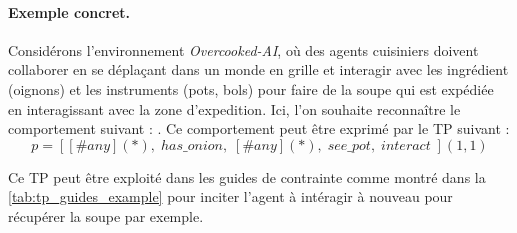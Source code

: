 \documentclass[francais,ROIA,Unicode,manuscript]{cedram}
\begin{document}
\paragraph{Exemple concret.} Considérons l’environnement \textit{Overcooked-AI}, où des agents cuisiniers doivent collaborer en se déplaçant dans un monde en grille et interagir avec les ingrédient (oignons) et les instruments (pots, bols) pour faire de la soupe qui est expédiée en interagissant avec la zone d'expedition. Ici, l’on souhaite reconnaître le comportement suivant : . Ce comportement peut être exprimé par le TP suivant :
\[
    p = [[\#any](*) , \; has\_onion , \; [\#any](*) , \; see\_pot , \; interact \;](1,1)
\]

\noindent
Ce TP peut être exploité dans les guides de contrainte comme montré dans la \autoref{tab:tp_guides_example} pour inciter l'agent à intéragir à nouveau pour récupérer la soupe par exemple.
\end{document}
